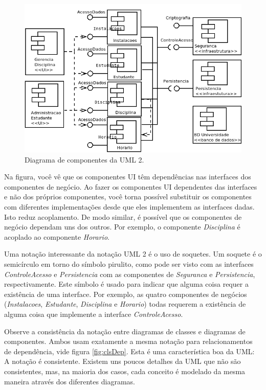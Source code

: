 \documentclass[
	11pt,				%
	openright,
	twoside,			%
	a4paper,			%
	english,			%
	french,
	brazil,				%
	sumario=tradicional
	]{abntex2}
\begin{document}
\begin{figure}
\begin{center}
\includegraphics[scale=0.5]{componente.png}
\end{center}
\caption{Diagrama de componentes da UML 2.} \label{fig:compo}
\end{figure}

Na figura, você vê que os componentes UI têm dependências nas interfaces dos componentes de negócio. Ao fazer os componentes UI dependentes das interfaces e não dos próprios componentes, você torna possível substituir os componentes com diferentes implementações desde que eles implementem as interfaces dadas. Isto reduz acoplamento. De modo similar, é possível que os componentes de negócio dependam uns dos outros. Por exemplo, o componente \emph{Disciplina} é acoplado ao componente \emph{Horario}. 

Uma notação interessante da notação UML 2 é o uso de soquetes. Um soquete é o semicírculo em torno do símbolo pirulito, como pode ser visto com as interfaces \emph{ControleAcesso} e \emph{Persistencia} com as componentes de \emph{Seguranca} e \emph{Persistencia}, respectivamente. Este símbolo é usado para indicar que alguma coisa requer a existência de uma interface. Por exemplo, as quatro componentes de negócios (\emph{Instalacoes}, \emph{Estudante}, \emph{Disciplina} e \emph{Horario}) todas requerem a existência de alguma coisa que implemente a interface \emph{ControleAcesso}.

Observe a consistência da notação entre diagramas de classes e diagramas de componentes. Ambos usam exatamente a mesma notação para relacionamentos de dependência, vide figura \ref{fig:clsDep}. Esta é uma característica boa da UML: A notação é consistente. Existem uns poucos detalhes da UML que não são consistentes, mas, na maioria dos casos, cada conceito é modelado da mesma maneira através dos diferentes diagramas.
\end{document}
